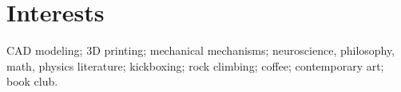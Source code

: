 \section{Interests}

\noindent
CAD modeling; 3D printing; mechanical mechanisms; neuroscience, philosophy, math, physics literature; kickboxing; rock climbing; coffee; contemporary art; book club.

